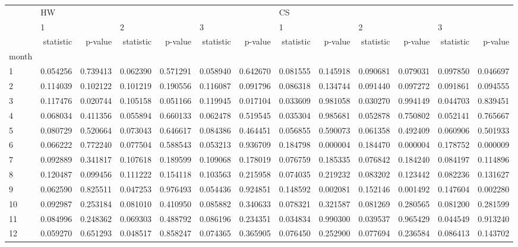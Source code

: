 \begin{tabular}{lrrrrrrrrrrrr}
\toprule
{} & \multicolumn{6}{l}{HW} & \multicolumn{6}{l}{CS} \\
{} & \multicolumn{2}{l}{1} & \multicolumn{2}{l}{2} & \multicolumn{2}{l}{3} & \multicolumn{2}{l}{1} & \multicolumn{2}{l}{2} & \multicolumn{2}{l}{3} \\
{} & statistic &   p-value & statistic &   p-value & statistic &   p-value & statistic &   p-value & statistic &   p-value & statistic &   p-value \\
month &           &           &           &           &           &           &           &           &           &           &           &           \\
\midrule
1     &  0.054256 &  0.739413 &  0.062390 &  0.571291 &  0.058940 &  0.642670 &  0.081555 &  0.145918 &  0.090681 &  0.079031 &  0.097850 &  0.046697 \\
2     &  0.114039 &  0.102122 &  0.101219 &  0.190556 &  0.116087 &  0.091796 &  0.086318 &  0.134744 &  0.091440 &  0.097272 &  0.091861 &  0.094555 \\
3     &  0.117476 &  0.020744 &  0.105158 &  0.051166 &  0.119945 &  0.017104 &  0.033609 &  0.981058 &  0.030270 &  0.994149 &  0.044703 &  0.839451 \\
4     &  0.068034 &  0.411356 &  0.055894 &  0.660133 &  0.062478 &  0.519545 &  0.035304 &  0.985681 &  0.052878 &  0.750802 &  0.052141 &  0.765667 \\
5     &  0.080729 &  0.520664 &  0.073043 &  0.646617 &  0.084386 &  0.464451 &  0.056855 &  0.590073 &  0.061358 &  0.492409 &  0.060906 &  0.501933 \\
6     &  0.066222 &  0.772240 &  0.077504 &  0.588543 &  0.053213 &  0.936709 &  0.184798 &  0.000004 &  0.184470 &  0.000004 &  0.178752 &  0.000009 \\
7     &  0.092889 &  0.341817 &  0.107618 &  0.189599 &  0.109068 &  0.178019 &  0.076759 &  0.185335 &  0.076842 &  0.184240 &  0.084197 &  0.114896 \\
8     &  0.120487 &  0.099456 &  0.111222 &  0.154118 &  0.103563 &  0.215958 &  0.074035 &  0.219232 &  0.083202 &  0.123442 &  0.082236 &  0.131627 \\
9     &  0.062590 &  0.825511 &  0.047253 &  0.976493 &  0.054436 &  0.924851 &  0.148592 &  0.002081 &  0.152146 &  0.001492 &  0.147604 &  0.002280 \\
10    &  0.092987 &  0.253184 &  0.081010 &  0.410950 &  0.085882 &  0.340633 &  0.078321 &  0.321587 &  0.081269 &  0.280565 &  0.081200 &  0.281599 \\
11    &  0.084996 &  0.248362 &  0.069303 &  0.488792 &  0.086196 &  0.234351 &  0.034834 &  0.990300 &  0.039537 &  0.965429 &  0.044549 &  0.913240 \\
12    &  0.059270 &  0.651293 &  0.048517 &  0.858247 &  0.074365 &  0.365905 &  0.076450 &  0.252900 &  0.077694 &  0.236584 &  0.086413 &  0.143702 \\
\bottomrule
\end{tabular}

